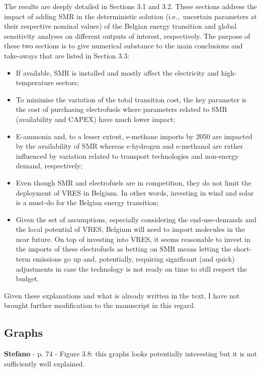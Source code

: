 \documentclass[12pt,a4paper]{article}
\def\ie{i.e.,\ }
\begin{document}
\noindent The results are deeply detailed in Sections 3.1 and 3.2. These sections address the impact of adding SMR in the deterministic solution (\ie uncertain parameters at their respective nominal values) of the Belgian energy transition and global sensitivity analyses on different outputs of interest, respectively.  The purpose of these two sections is to give numerical substance to the main conclusions and take-aways that are listed in Section 3.3:
\begin{itemize}
\item If available, SMR is installed and mostly affect the electricity and high-temperature sectors;
\item To minimise the variation of the total transition cost, the key parameter is the cost of purchasing electrofuels where parameters related to SMR (availability and CAPEX) have much lower impact;
\item E-ammonia and, to a lesser extent, e-methane imports by 2050 are impacted by the availability of SMR whereas e-hydrogen and e-methanol are rather influenced by variation related to transport technologies and non-energy demand, respectively;
\item Even though SMR and electrofuels are in competition, they do not limit the deployment of VRES in Belgium. In other words, investing in wind and solar is a must-do for the Belgian energy transition;
\item Given the set of assumptions, especially considering the end-use-demands and the local potential of VRES, Belgium will need to import molecules in the near future. On top of investing into VRES, it seems reasonable to invest in the imports of these electrofuels as betting on SMR means letting the short-term emissions go up and, potentially, requiring significant (and quick) adjustments in case the technology is not ready on time to still respect the  budget.
\end{itemize}

Given these explanations and what is already written in the text, I have not brought further modification to the manuscript in this regard.

\subsection{Graphs}
\begin{mdframed}[style=comment] %
{\color{orange} \textbf{Stefano}} - p. 74 - Figure 3.8: this graphs looks potentially interesting but it is not sufficiently well explained.
\end{mdframed}
\end{document}
